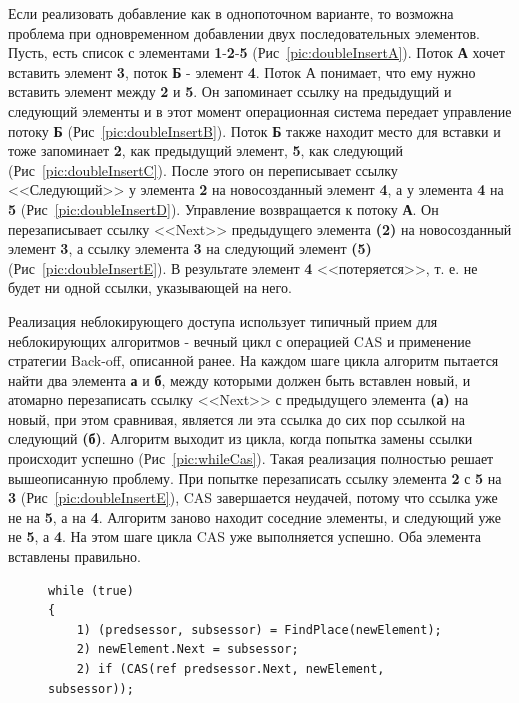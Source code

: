 \documentclass[12pt]{article}
\begin{document}
{				\par Если реализовать добавление как в однопоточном варианте, то возможна проблема при одновременном добавлении двух последовательных элементов. Пусть, есть список с элементами \textbf{1}-\textbf{2}-\textbf{5} (Рис~\ref{pic:doubleInsertA}). Поток \textbf{А} хочет вставить элемент \textbf{3}, поток \textbf{Б} - элемент \textbf{4}. Поток А понимает, что ему нужно вставить элемент между \textbf{2} и \textbf{5}. Он запоминает ссылку на предыдущий и следующий элементы и в этот момент операционная система передает управление потоку \textbf{Б} (Рис~\ref{pic:doubleInsertB}). Поток \textbf{Б} также находит место для вставки и тоже запоминает \textbf{2}, как предыдущий элемент, \textbf{5}, как следующий (Рис~\ref{pic:doubleInsertC}). После этого он переписывает ссылку <<Следующий>> у элемента \textbf{2} на новосозданный элемент \textbf{4}, а у элемента \textbf{4} на \textbf{5} (Рис~\ref{pic:doubleInsertD}). Управление возвращается к потоку \textbf{А}. Он перезаписывает ссылку <<Next>> предыдущего элемента \textbf{(2)} на новосозданный элемент \textbf{3}, а ссылку элемента \textbf{3} на следующий элемент \textbf{(5)} (Рис~\ref{pic:doubleInsertE}). В результате элемент \textbf{4} <<потеряется>>, т. е. не будет ни одной ссылки, указывающей на него.
				\par Реализация неблокирующего доступа использует типичный прием для неблокирующих алгоритмов - вечный цикл с операцией CAS и применение стратегии Back-off, описанной ранее. На каждом шаге цикла алгоритм пытается найти два элемента \textbf{а} и \textbf{б}, между которыми должен быть вставлен новый, и атомарно перезаписать ссылку <<Next>> с предыдущего элемента \textbf{(а)} на новый, при этом сравнивая, является ли эта ссылка до сих пор ссылкой на следующий \textbf{(б)}. Алгоритм выходит из цикла, когда попытка замены ссылки происходит успешно (Рис~\ref{pic:whileCas}). Такая реализация полностью решает вышеописанную проблему. При попытке перезаписать ссылку элемента \textbf{2} с \textbf{5} на \textbf{3}  (Рис~\ref{pic:doubleInsertE}), CAS завершается неудачей, потому что ссылка уже не на \textbf{5}, а на \textbf{4}. Алгоритм заново находит соседние элементы, и следующий уже не \textbf{5}, а \textbf{4}. На этом шаге цикла CAS уже выполняется успешно. Оба элемента вставлены правильно.
				\begin{figure}[h]
					\begin{lstlisting}
while (true)
{	
	1) (predsessor, subsessor) = FindPlace(newElement);
	2) newElement.Next = subsessor;
	2) if (CAS(ref predsessor.Next, newElement, subsessor));

\end{lstlisting}
\end{figure}}
\end{document}
